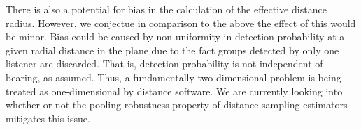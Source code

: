 \documentclass[10pt,a4paper,final]{article}
\begin{document}
There is also a potential for bias in the calculation of the effective distance radius. However, we conjectue in comparison to the above the effect of this would be minor. Bias could be caused by non-uniformity in detection probability at a given radial distance in the plane due to the fact groups detected by only one listener are discarded. That is, detection probability is not independent of bearing, as assumed. Thus, a fundamentally two-dimensional problem is being treated as one-dimensional by distance software. We are currently looking into whether or not the pooling robustness property of distance sampling estimators mitigates this issue.




\end{document}
